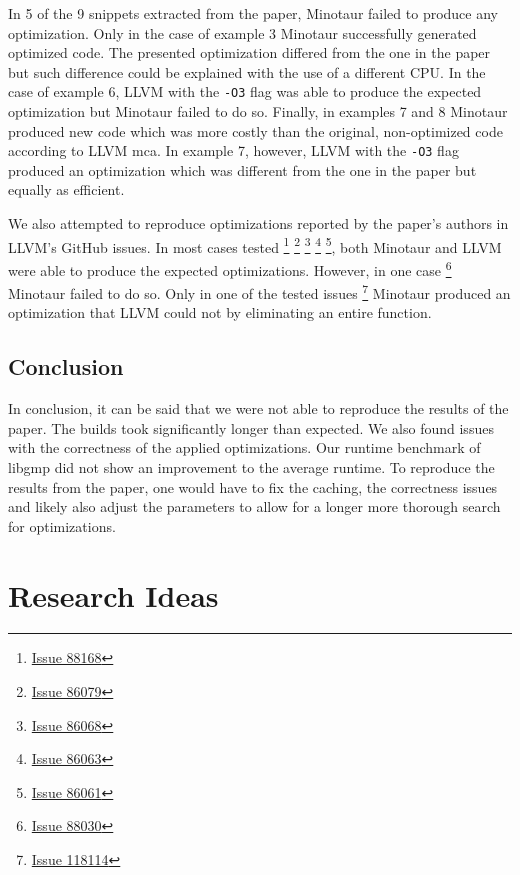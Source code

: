 	In 5 of the 9 snippets extracted from the paper, Minotaur failed to produce any optimization.
	Only in the case of example 3 Minotaur successfully generated optimized code.
	The presented optimization differed from the one in the paper but such difference could be explained with the use of a different CPU.
	In the case of example 6, LLVM with the \texttt{-O3} flag was able to produce the expected optimization but Minotaur failed to do so.
	Finally, in examples 7 and 8 Minotaur produced new code which was more costly than the original, non-optimized code according to LLVM \gls*{mca}.
	In example 7, however, LLVM with the \texttt{-O3} flag produced an optimization which was different from the one in the paper but equally as efficient.

	We also attempted to reproduce optimizations reported by the paper's authors in LLVM's GitHub issues.
	In most cases tested \footnote{\href{https://github.com/llvm/llvm-project/issues/88168}{Issue 88168}} \footnote{\href{https://github.com/llvm/llvm-project/issues/86079}{Issue 86079}} \footnote{\href{https://github.com/llvm/llvm-project/issues/86068}{Issue 86068}} \footnote{\href{https://github.com/llvm/llvm-project/issues/86063}{Issue 86063}} \footnote{\href{https://github.com/llvm/llvm-project/issues/86061}{Issue 86061}}, both Minotaur and LLVM were able to produce the expected optimizations.
	However, in one case \footnote{\href{https://github.com/llvm/llvm-project/issues/88030}{Issue 88030}} Minotaur failed to do so.
	Only in one of the tested issues \footnote{\href{https://github.com/llvm/llvm-project/issues/118114}{Issue 118114}} Minotaur produced an optimization that LLVM could not by eliminating an entire function.

	\subsection{Conclusion}
	In conclusion, it can be said that we were not able to reproduce the results of the paper.
	The builds took significantly longer than expected.
	We also found issues with the correctness of the applied optimizations.
	Our runtime benchmark of libgmp did not show an improvement to the average runtime.
	To reproduce the results from the paper, one would have to fix the caching, the correctness issues and likely also adjust the parameters to allow for a longer more thorough search for optimizations.
 	
 	\section{Research Ideas}
 	

